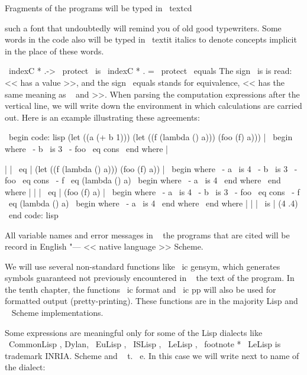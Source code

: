 Fragments of the programs will be typed in \ textcd {such a font that undoubtedly
will remind you of old good typewriters. Some words in the code also
will be typed in \ textit {italics} to denote concepts implicit in
the place of these words.

\ indexC * {.->} { \ protect \ is }
\ indexC * {. =} { \ protect \ equals }
The sign { \ is } is read: << has a value >>, and the sign { \ equals } stands for
equivalence, << has the same meaning as ~ and >>. When parsing the computation
expressions after the vertical line, we will write down the environment in which
calculations are carried out. Here is an example illustrating these agreements:

\ begin {code: lisp}
(let ((a (+ b 1)))
  (let ((f (lambda () a)))
    (foo (f) a))) | \ begin {where}
                    \ - b { \ is } 3
                    \ - foo { \ eq } cons
                    \ end {where} |

| | \ eq | (let ((f (lambda () a))) (foo (f) a)) | \ begin {where}
                                            \ - a { \ is } 4
                                            \ - b { \ is } 3
                                            \ - foo { \ eq } cons
                                            \ - f { \ eq } (lambda () a) \ begin {where}
                                                                   \ - a { \ is } 4
                                                                   \ end {where}
                                            \ end {where} |
| | \ eq | (foo (f) a) | \ begin {where}
                  \ - a { \ is } 4
                  \ - b { \ is } 3
                  \ - foo { \ eq } cons
                  \ - f { \ eq } (lambda () a) \ begin {where}
                                         \ - a { \ is } 4
                                         \ end {where}
                  \ end {where} |
| | \ is | (4 .4)
\ end {code: lisp}

All variable names and error messages in ~ the programs that are cited will be
record in English "--- << native language >> Scheme.

We will use several non-standard functions like \ ic {gensym}, which
generates symbols guaranteed not previously encountered in ~ the text of the program.
In the tenth chapter, the functions \ ic {format} and \ ic {pp} will also be used for
formatted output (pretty-printing). These functions are in the majority
Lisp and ~ Scheme implementations.

Some expressions are meaningful only for some of the Lisp dialects like
\ CommonLisp , Dylan, \ EuLisp , \ ISLisp , \ LeLisp , \ footnote * {{ \ LeLisp } is
trademark INRIA.} Scheme and ~ t. \, e. In this case we will write next to
name of the dialect:

}
